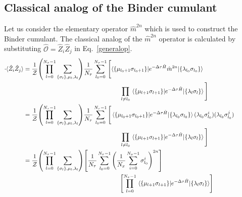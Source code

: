 \documentclass[../thesis_main.tex]{subfiles}
\begin{document}
\subsection{Classical analog of the Binder cumulant}
Let us consider the elementary operator $\hat{m}^{2n}$ which is used to construct the Binder cumulant. The classical analog of the $\hat{m}^{2n}$ operator is calculated by substituting $\hat{\mathcal{O}} =  \hat{Z}_i \hat{Z}_j$ in Eq.~\eqref{generalop}.
\begingroup
\allowdisplaybreaks
\begin{align}
    \cdot \langle {\hat{Z}_i \hat{Z}_j} \rangle &= \frac{1}{\mathcal{Z} }\qty(\prod_{l=0}^{N_\tau - 1} \sum_{\{\sigma_l \}, \mu_l, \lambda_l}) \frac{1}{N_\tau} \sum_{l_0 = 0}^{N_\tau - 1} \Bigg[\langle\{\mu_{l_0+1} \sigma _{l_0+1}\}|{e^{-\Delta \tau \hat{H}}{\hat{m}^{2n}}}|{\{\lambda_{l_0} \sigma _{l_0}\}} \rangle \qquad \qquad \nonumber\\
    &\qquad \qquad \qquad \qquad \qquad \qquad \qquad \qquad \prod_{l \neq l_0} \mel{\{\mu_{l+1} \sigma _{l+1}\}}{e^{-\Delta \tau \hat{H}}}{\{\lambda_{l} \sigma _{l}\}} \Bigg] \nonumber \\
    & =  \frac{1}{\mathcal{Z} }\qty(\prod_{l=0}^{N_\tau - 1} \sum_{\{\sigma_l \}, \mu_l, \lambda_l}) \frac{1}{N_\tau} \sum_{l_0 = 0}^{N_\tau - 1} \Bigg[\mel{\{\mu_{l_0+1} \sigma _{l_0+1}\}}{e^{-\Delta \tau \hat{H}}}{\{\lambda_{l_0} \sigma _{l_0}\}} (\lambda_{l_0} \sigma^i_{l_0})(\lambda_{l_0} \sigma^j_{l_0}) \qquad \qquad \nonumber \\ 
    & \qquad \qquad \qquad \qquad \qquad \qquad \qquad \qquad \prod_{l \neq l_0} \mel{\{\mu_{l+1} \sigma _{l+1}\}}{e^{-\Delta \tau \hat{H}}}{\{\lambda_{l} \sigma _{l}\}}\Bigg] \nonumber \\ 
    & = \frac{1}{\mathcal{Z} }\qty(\prod_{l=0}^{N_\tau - 1} \sum_{\{\sigma_l \}, \mu_l, \lambda_l}) \qty[\frac{1}{N_\tau} \sum_{l_0 = 0}^{N_\tau - 1}  \qty(\frac{1}{N_x} \sum_{i=0}^{N_x-1} \sigma^i_{l_0})^{2n}]  \nonumber  \\
    & \qquad \qquad \qquad \qquad \qquad \qquad \qquad \qquad\qty[\prod_{l = 0}^{N_\tau - 1} \mel{\{\mu_{l+1} \sigma _{l+1}\}}{e^{-\Delta \tau \hat{H}}}{\{\lambda_{l} \sigma _{l}\}}]
\end{align}
\endgroup
\end{document}
